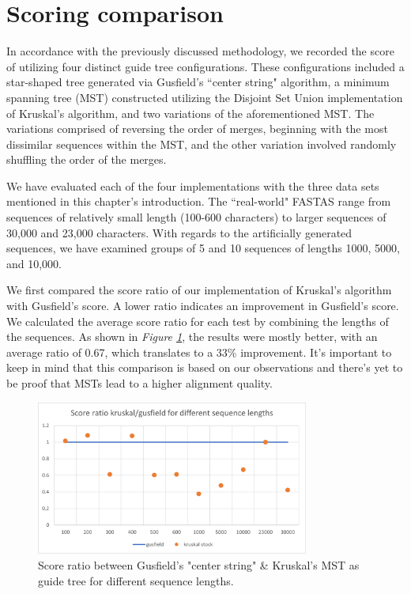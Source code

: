 \documentclass[twoside,openright,titlepage,numbers=noenddot,headinclude,%
                footinclude=true,cleardoublepage=empty,abstractoff, %
                BCOR=5mm,paper=a4,fontsize=11pt,%
                ngerman,american,%
                ]{scrreprt}
\begin{document}
\section{Scoring comparison}

In accordance with the previously discussed methodology, we recorded the score of utilizing four distinct guide tree configurations. These configurations included a star-shaped tree generated via Gusfield's ``center string" algorithm, a minimum spanning tree (MST) constructed utilizing the Disjoint Set Union implementation of Kruskal's algorithm, and two variations of the aforementioned MST. The variations comprised of reversing the order of merges, beginning with the most dissimilar sequences within the MST, and the other variation involved randomly shuffling the order of the merges.

We have evaluated each of the four implementations with the three data sets mentioned in this chapter's introduction. The ``real-world" FASTAS range from sequences of relatively small length (100-600 characters) to larger sequences of 30,000 and 23,000 characters. With regards to the artificially generated sequences, we have examined groups of 5 and 10 sequences of lengths 1000, 5000, and 10,000.

We first compared the score ratio of our implementation of Kruskal's algorithm with Gusfield's score. A lower ratio indicates an improvement in Gusfield's score. We calculated the average score ratio for each test by combining the lengths of the sequences. As shown in \textit{Figure \ref{fig:gusVSkruskal}}, the results were mostly better, with an average ratio of 0.67, which translates to a 33\% improvement. It's important to keep in mind that this comparison is based on our observations and there's yet to be proof that MSTs lead to a higher alignment quality.

\begin{figure}[H]
\includegraphics[width=0.8\textwidth]{kruskalVSgudfield.png}
\centering
\caption{Score ratio between Gusfield's "center string" \& Kruskal's MST as guide tree for different sequence lengths.}
\label{fig:gusVSkruskal}
\end{figure}
\end{document}
